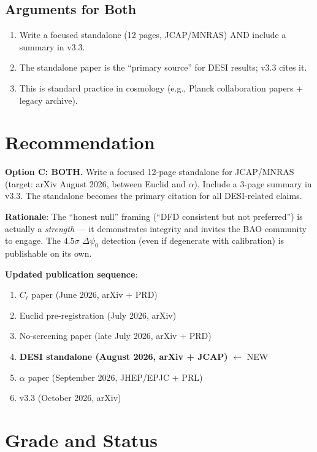 \documentclass[11pt,a4paper]{article}
\begin{document}
\subsection{Arguments for Both}

\begin{enumerate}
\item Write a focused standalone (12 pages, JCAP/MNRAS) AND include a summary in v3.3.
\item The standalone paper is the ``primary source'' for DESI results; v3.3 cites it.
\item This is standard practice in cosmology (e.g., Planck collaboration papers + legacy archive).
\end{enumerate}

\section{Recommendation}

\begin{tcolorbox}[colback=blue!5!white,colframe=blue!40!black,title=DESI Paper Recommendation]
\textbf{Option C: BOTH.} Write a focused 12-page standalone for JCAP/MNRAS (target: arXiv August 2026, between Euclid and $\alpha$). Include a 3-page summary in v3.3. The standalone becomes the primary citation for all DESI-related claims.

\textbf{Rationale}: The ``honest null'' framing (``DFD consistent but not preferred'') is actually a \textit{strength} --- it demonstrates integrity and invites the BAO community to engage. The $4.5\sigma$ $\Delta\psi_0$ detection (even if degenerate with calibration) is publishable on its own.

\textbf{Updated publication sequence}:
\begin{enumerate}
\item $C_\ell$ paper (June 2026, arXiv + PRD)
\item Euclid pre-registration (July 2026, arXiv)
\item No-screening paper (late July 2026, arXiv + PRD)
\item \textbf{DESI standalone (August 2026, arXiv + JCAP)} $\leftarrow$ NEW
\item $\alpha$ paper (September 2026, JHEP/EPJC + PRL)
\item v3.3 (October 2026, arXiv)
\end{enumerate}
\end{tcolorbox}

\section{Grade and Status}
\end{document}

